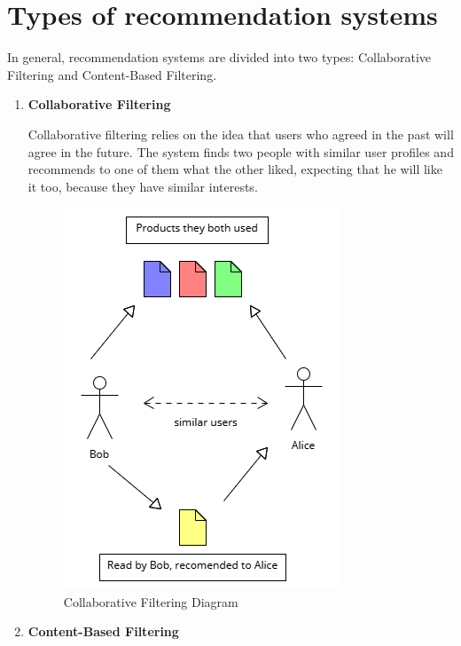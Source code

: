\documentclass[10pt,twoside,slovak,a4paper]{article}
\begin{document}
\newpage
\section{Types of recommendation systems} \label{Types of recommendation systems}

In general, recommendation systems are divided into two types: Collaborative Filtering and Content-Based Filtering\cite{types}.

\begin{enumerate}
\item  \textbf{Collaborative Filtering}

Collaborative filtering relies on the idea that users who agreed in the past will agree in the future. The system finds two people with similar user profiles and recommends to one of them what the other liked, expecting that he will like it too, because they have similar interests.
\begin{figure}[!h]
    \centering
    \includegraphics[width=0.8\linewidth]{Diagram 3.png}
    \caption{Collaborative Filtering Diagram}
    \label{fig:collaborative}
\end{figure}

\newpage
\item  \textbf{Content-Based Filtering}


\end{enumerate}
\end{document}
